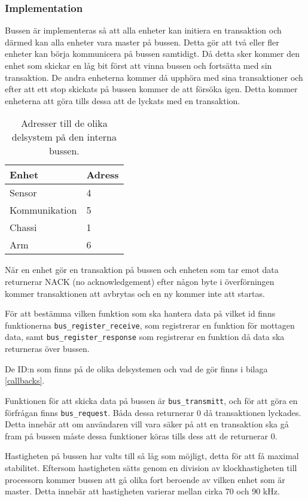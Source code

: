 \subsubsection{Implementation}
\label{sec:bus-implementation}
Bussen är implementeras så att alla enheter kan initiera en transaktion och därmed kan alla enheter vara master på bussen. Detta gör att två eller fler enheter kan börja kommunicera på bussen samtidigt. Då detta sker kommer den enhet som skickar en låg bit först att vinna bussen och fortsätta med sin transaktion. De andra enheterna kommer då upphöra med sina transaktioner och efter att ett stop skickats på bussen kommer de att försöka igen. Detta kommer enheterna att göra tills dessa att de lyckats med en transaktion.

\begin{table}[H]
\centering
\label{adress-buss}
\begin{tabularx}{0.5\textwidth}{|X|X|}
\hline
\textbf{Enhet} & \textbf{Adress} \\ \hline
Sensor & 4 \\ \hline
Kommunikation & 5 \\ \hline
Chassi & 1 \\ \hline
Arm & 6 \\ \hline
\end{tabularx}
\caption{Adresser till de olika delsystem på den interna bussen.}
\end{table}

När en enhet gör en transaktion på bussen och enheten som tar emot data returnerar NACK (no acknowledgement) efter någon byte i överförningen kommer transaktionen att avbrytas och en ny kommer inte att startas.

För att bestämma vilken funktion som ska hantera data på vilket id finns funktionerna \verb|bus_register_receive|, som registrerar en funktion för mottagen data, samt \verb|bus_register_response| som registrerar en funktion då data ska returneras över bussen.

De ID:n som finns på de olika delsystemen och vad de gör finns i bilaga \ref{callbacks}.

Funktionen för att skicka data på bussen är \verb|bus_transmitt|, och för att göra en förfrågan finns \verb|bus_request|. Båda dessa returnerar 0 då transaktionen lyckades. Detta innebär att om användaren vill vara säker på att en transaktion ska gå fram på bussen måste dessa funktioner köras tills dess att de returnerar 0.

Hastigheten på bussen har valts till så låg som möjligt, detta för att få maximal stabilitet. Eftersom hastigheten sätts genom en division av klockhastigheten till processorn kommer bussen att gå olika fort beroende av vilken enhet som är master. Detta innebär att hastigheten varierar mellan cirka 70 och 90 kHz.

